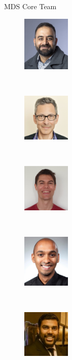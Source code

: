 \documentclass[
  ignorenonframetext,
  aspectratio=169,
]{beamer}
\begin{document}
\begin{frame}{MDS Core Team}
\label{mds-core-team}
\begin{figure}

\begin{minipage}{0.40\linewidth}
\includegraphics[width=0.9in,height=\textheight]{figs/usman-a.jpeg}\end{minipage}%
%
\begin{minipage}{0.20\linewidth}
~\end{minipage}%
%
\begin{minipage}{0.40\linewidth}
\includegraphics[width=0.9in,height=\textheight]{figs/joe-b.jpg}\end{minipage}%
\newline
\begin{minipage}{0.30\linewidth}
~\end{minipage}%
%
\begin{minipage}{0.40\linewidth}
\includegraphics[width=0.9in,height=\textheight]{figs/chris-s.png}\end{minipage}%
%
\begin{minipage}{0.30\linewidth}
~\end{minipage}%
\newline
\begin{minipage}{0.40\linewidth}
\includegraphics[width=0.9in,height=\textheight]{figs/kumar-y.jpg}\end{minipage}%
%
\begin{minipage}{0.20\linewidth}
~\end{minipage}%
%
\begin{minipage}{0.40\linewidth}
\includegraphics[width=0.9in,height=\textheight]{figs/aarif-r.jpeg}\end{minipage}%


\end{figure}
\end{frame}
\end{document}
